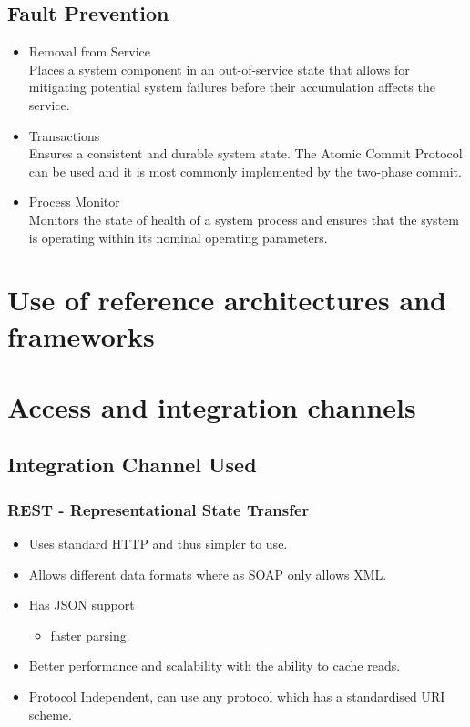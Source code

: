 \documentclass[12pt, oneside]{article}
\begin{document}
	\subsection{Fault Prevention}
	\begin{itemize}
		
		
		\item Removal from Service\\
		Places a system component in an out-of-service state that allows for mitigating potential system failures before their accumulation affects the service.
		
		\item Transactions\\
		Ensures a consistent and durable system state. The Atomic Commit Protocol can be used and it is most commonly implemented by the two-phase commit.
		
		\item Process Monitor\\
		Monitors the state of health of a system process and ensures that the system is operating within its nominal operating parameters.
	\end{itemize}



\section{Use of reference architectures and frameworks}
\newpage
\section{Access and integration channels}
	\subsection{Integration Channel Used}
		\subsubsection{REST - Representational State Transfer}
		\begin{itemize}
			\item Uses standard HTTP and thus simpler to use.
		 	\item Allows different data formats where as SOAP only allows XML.
			\item Has JSON support
				\begin{itemize}
					\item faster parsing.				
				\end{itemize}			 
			\item Better performance and scalability with the ability to cache reads.
			\item Protocol Independent, can use any protocol which has a standardised URI scheme.		
		\end{itemize}
\end{document}
